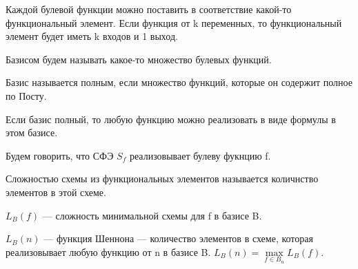 Каждой булевой функции можно поставить в соответствие какой-то функциональный
элемент. Если функция от k переменных, то функциональный элемент будет иметь k
входов и 1 выход.

Базисом будем называть какое-то множество булевых функций.
\begin{definition}
	Базис называется полным, если множество функций, которые он содержит
	полное по Посту.
\end{definition}

Если базис полный, то любую функцию можно реализовать в виде формулы в этом
базисе. 

Будем говорить, что СФЭ $S_f$ реализовывает булеву фукнцию f.

\begin{definintion}
	Сложностью схемы из функциональных элементов называется количнство
	элементов в этой схеме.
\end{definintion}

$L_B(f)$ --- сложность минимальной схемы для f в базисе B.

$L_B(n)$ --- функция Шеннона --- количество элементов в схеме, которая
реализовывает любую функцию от n в базисе B.  $L_B(n) = \max\limits_{f\in
B_n}L_B(f) $.

